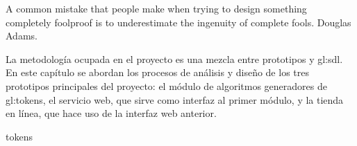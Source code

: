 %
%

\label{sec:analisis_y_disenio}
{%
  A common mistake that people make when trying to design something completely
  foolproof is to underestimate the ingenuity of complete fools.%
}
{%
   Douglas Adams.%
}

\noindent
La metodología ocupada en el proyecto es una mezcla entre prototipos y
\gls{gl:sdl}. En este capítulo se abordan los procesos de análisis y
diseño de los tres prototipos principales del proyecto: el módulo de
algoritmos generadores de \glspl{gl:token}, el servicio web, que sirve
como interfaz al primer módulo, y la tienda en línea, que hace uso de
la interfaz web anterior.

{tokens}
